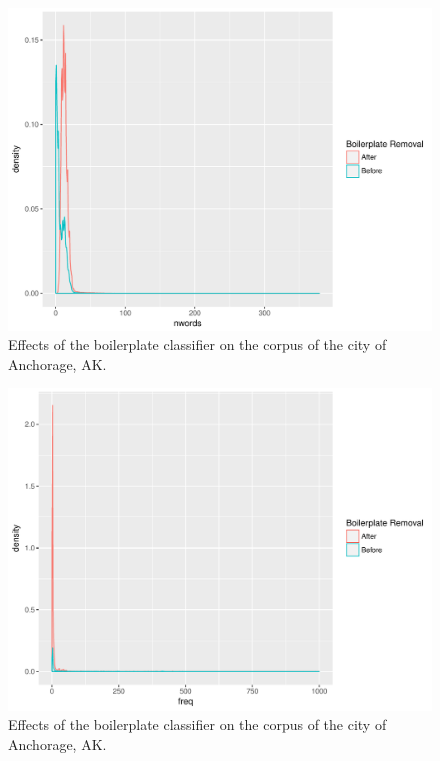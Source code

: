 \documentclass[11pt]{article}
\begin{document}
\begin{figure}[htp]
	\centering
	\caption{Effects of the boilerplate classifier on the corpus of the city of Anchorage, AK.}
	\label{boilerplate_before_after1}
	\includegraphics[width=\linewidth]{figures/boilerplateBeforeAfterNwords.pdf}
\end{figure}
\begin{figure}[htp]
	\centering
	\caption{Effects of the boilerplate classifier on the corpus of the city of Anchorage, AK.}
	\label{boilerplate_before_after2}
	\includegraphics[width=\linewidth]{figures/boilerplateBeforeAfterFreq.pdf}
\end{figure}
\end{document}
